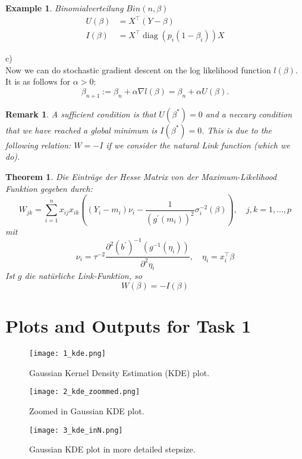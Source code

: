 \documentclass[a4paper,oneside,bibliography=totoc]{scrartcl}
\newtheorem{rem}{Remark}[section]
\newtheorem{Satz}{Theorem}[section]
\newtheorem{ex}{Example}[section]
\begin{document}
\begin{ex}
    Binomialverteilung $Bin(n,\beta)$
$$
\begin{aligned}
U(\beta) & =X^{\top}(Y-\beta) \\
I(\beta) & =X^{\top} \operatorname{diag}\left(p_i\left(1-\beta_i\right)\right) X
\end{aligned}
$$
\end{ex}
c)\\
Now we can do stochastic gradient descent on the log likelihood function $l(\beta)$. It is as follows for $\alpha >0:$
$$
\beta_{n+1} := \beta_n + \alpha \nabla l (\beta) = \beta_n + \alpha U(\beta).
$$

\begin{rem}
    A sufficient condition is that $U(\beta^*)=0$ and a neccary condition that we have reached a global minimum is $I(\beta^*)=0$. This is due to the following relation: $W = - I$ if we consider the natural Link function (which we do).
\end{rem}

\begin{Satz}
Die Einträge der Hesse Matrix von der Maximum-Likelihood Funktion gegeben durch:
    $$
W_{j k}=\sum_{i=1}^n x_{i j} x_{i k}\left(\left(Y_i-m_i\right) \nu_i-\frac{1}{\left(g^{\prime}\left(m_i\right)\right)^2} \sigma_i^{-2}(\beta)\right), \quad j, k=1, \ldots, p
$$
mit
$$
\nu_i=\tau^{-2} \frac{\partial^2\left(b^{\prime}\right)^{-1}\left(g^{-1}\left(\eta_i\right)\right)}{\partial^2 \eta_i}, \quad \eta_i=x_i^{\top} \beta
$$
Ist $g$ die natürliche Link-Funktion, so
$$
W(\beta)=-I(\beta)
$$
\end{Satz}


\section{Plots and Outputs for Task 1}
\label{section1}

\begin{figure}[H]
    \centering
    \texttt{[image: 1\_kde.png]}
    \caption{Gaussian Kernel Density Estimation (KDE) plot.}
    \label{fig:1}
\end{figure}

\begin{figure}[H]
    \centering
    \texttt{[image: 2\_kde\_zoommed.png]}
    \caption{Zoomed in Gaussian KDE plot.}
    \label{fig:2}
\end{figure}

\begin{figure}[H]
    \centering
    \texttt{[image: 3\_kde\_inN.png]}
    \caption{Gaussian KDE plot in more detailed stepsize.}
    \label{fig:3}
\end{figure}
\end{document}
